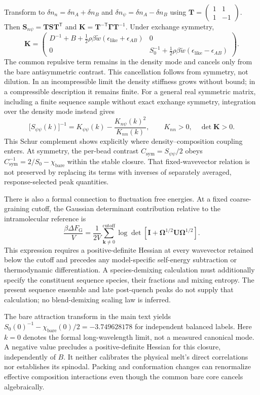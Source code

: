 Transform to $\delta n_n=\delta n_A+\delta n_B$ and $\delta n_\psi=\delta n_A-\delta n_B$ using $\mathbf T=\left(\begin{smallmatrix}1&1\\1&-1\end{smallmatrix}\right)$. Then $\mathbf S_{n\psi}=\mathbf T\mathbf S\mathbf T^{\mathsf T}$ and $\mathbf K=\mathbf T^{-\mathsf T}\boldsymbol\Gamma\mathbf T^{-1}$. Under exchange symmetry,
\[
\mathbf K=
\begin{pmatrix}
 D^{-1}+B+\tfrac12\rho\beta\widetilde w(\epsilon_{\mathrm{like}}+\epsilon_{AB})&0\\
 0&S_0^{-1}+\tfrac12\rho\beta\widetilde w(\epsilon_{\mathrm{like}}-\epsilon_{AB})
\end{pmatrix}.
\]
The common repulsive term remains in the density mode and cancels only from the bare antisymmetric contrast. This cancellation follows from symmetry, not dilution. In an incompressible limit the density stiffness grows without bound; in a compressible description it remains finite. For a general real symmetric matrix, including a finite sequence sample without exact exchange symmetry, integration over the density mode instead gives
\[
\bigl[S_{\psi\psi}(k)\bigr]^{-1}
 =K_{\psi\psi}(k)-\frac{K_{n\psi}(k)^2}{K_{nn}(k)},
\qquad K_{nn}>0,\quad \det\mathbf K>0.
\]
This Schur complement shows explicitly where density--composition coupling enters. At symmetry, the per-bead contrast $C_{\mathrm{sym}}=S_{\psi\psi}/2$ obeys $C_{\mathrm{sym}}^{-1}=2/S_0-\chi_{\mathrm{bare}}$ within the stable closure. That fixed-wavevector relation is not preserved by replacing its terms with inverses of separately averaged, response-selected peak quantities.

There is also a formal connection to fluctuation free energies. At a fixed coarse-graining cutoff, the Gaussian determinant contribution relative to the intramolecular reference is
\[
\frac{\beta\Delta F_{\mathrm G}}V
 =\frac1{2V}\sum_{\bm k\ne0}^{\mathrm{cutoff}}
 \log\det\!\left[\mathbf I+
 \boldsymbol\Omega^{1/2}\mathbf U\boldsymbol\Omega^{1/2}\right].
\]
This expression requires a positive-definite Hessian at every wavevector retained below the cutoff and precedes any model-specific self-energy subtraction or thermodynamic differentiation. A species-demixing calculation must additionally specify the constituent sequence species, their fractions and mixing entropy. The present sequence ensemble and late post-quench peaks do not supply that calculation; no blend-demixing scaling law is inferred.

The bare attraction transform in the main text yields $S_0(0)^{-1}-\chi_{\mathrm{bare}}(0)/2=-3.749628178$ for independent balanced labels. Here $k=0$ denotes the formal long-wavelength limit, not a measured canonical mode. A negative value precludes a positive-definite Hessian for this closure, independently of $B$. It neither calibrates the physical melt's direct correlations nor establishes its spinodal. Packing and conformation changes can renormalize effective composition interactions even though the common bare core cancels algebraically.

